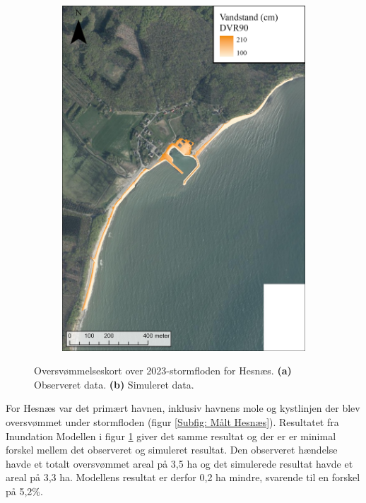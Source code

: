 \begin{figure}[H]
    \begin{subfigure}[t]{0.5\textwidth}
        \centering
        \includegraphics[width=0.95\linewidth]{images/Resultater/2023Model/2023 model_hesnaes.jpg}
        \caption{}
        \label{Subfig: Model Hesnæs}
    \end{subfigure}
    \caption{Oversvømmelseskort over 2023-stormfloden for Hesnæs. \textbf{(a)} Observeret data. \textbf{(b)} Simuleret data.}
    \label{Figur: Målt & simuleret Hesnæs}
\end{figure} 
For Hesnæs var det primært havnen, inklusiv havnens mole og kystlinjen der blev oversvømmet under stormfloden (figur \ref{Subfig: Målt Hesnæs}). Resultatet fra Inundation Modellen i figur \ref{Subfig: Model Hesnæs} giver det samme resultat og der er er minimal forskel mellem det observeret og simuleret resultat. Den observeret hændelse havde et totalt oversvømmet areal på 3,5 ha og det simulerede resultat havde et areal på 3,3 ha. Modellens resultat er derfor 0,2 ha mindre, svarende til en forskel på 5,2\%.\\

